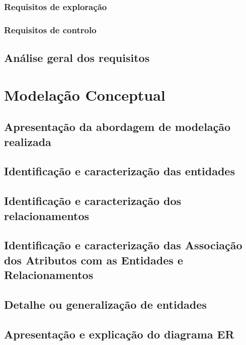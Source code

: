 \documentclass[11pt]{article} %
\begin{document}
\subsubsection{Requisitos de exploração}

\subsubsection{Requisitos de controlo}

\subsection{Análise geral dos requisitos}



\section{Modelação Conceptual}

\subsection{Apresentação da abordagem de modelação realizada}

\subsection{Identificação e caracterização das entidades}

\subsection{Identificação e caracterização dos relacionamentos}

\subsection{Identificação e caracterização das Associação dos Atributos com as Entidades e Relacionamentos}

\subsection{Detalhe ou generalização de entidades}

\subsection{Apresentação e explicação do diagrama ER}
\end{document}
